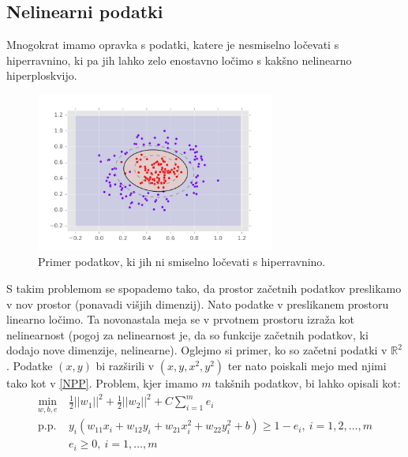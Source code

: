 \documentclass[mat1]{fmfdelo}
\newcommand{\R}{\mathbb R}
\begin{document}
\subsection{Nelinearni podatki}
\label{poglavjeNelinearniPodatki}
Mnogokrat imamo opravka s podatki, katere je nesmiselno ločevati s hiperravnino, ki pa jih lahko zelo enostavno ločimo s kakšno nelinearno hiperploskvijo. 
\begin{figure}[H]
	\centering
	\includegraphics[width=0.7\textwidth]{slike/RadialniPodatkiPolinomskaMeja.jpg}
	\caption{Primer podatkov, ki jih ni smiselno ločevati s hiperravnino.}
	\label{slikaPrimerPodatkovKiJihNiSmiselnoLocevatiSHiperploskvijo}
\end{figure}
S takim problemom se spopademo tako, da prostor začetnih podatkov preslikamo v nov prostor (ponavadi višjih dimenzij). Nato podatke v preslikanem prostoru linearno ločimo. Ta novonastala meja se v prvotnem prostoru izraža kot nelinearnost (pogoj za nelinearnost je, da so funkcije začetnih podatkov, ki dodajo nove dimenzije, nelinearne). Oglejmo si primer, ko so začetni podatki v $\R^2$. Podatke $(x, y)$ bi razširili v $(x, y, x^2, y^2)$ ter nato poiskali mejo med njimi tako kot v \eqref{NPP}. Problem, kjer imamo $m$ takšnih podatkov, bi lahko opisali kot: 
\begin{align}
\nonumber\min_{w, b, e}~&\frac{1}{2}||w_1||^2 +\frac{1}{2}||w_2||^2 +  C\sum_{i = 1}^{m}e_i \\
\nonumber\text{p.p.} ~ &y_i(w_{11}x_i + w_{12}y_i + w_{21}x_i^2 + w_{22}y_i^2  + b)\ge 1 - e_i, ~i= 1, 2, \ldots, m\\
\nonumber&e_i \ge 0,~ i = 1, \ldots, m
\end{align}
\end{document}
